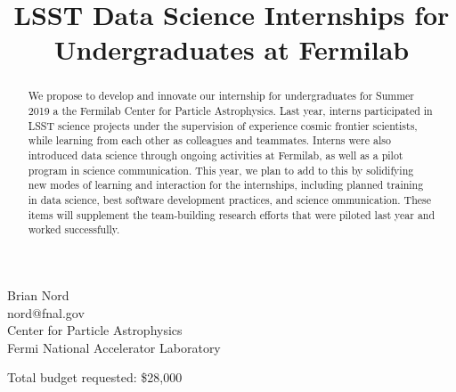 \title{%
LSST Data Science Internships for Undergraduates at Fermilab}
\date{} %


\maketitle

\vspace{-1.5cm}
\begin{center}
Brian Nord \\ nord@fnal.gov \\
Center for Particle Astrophysics\\
Fermi National Accelerator Laboratory\\
\vspace{0.3cm}
\end{center}
\vspace{1.5cm}

\begin{abstract}
\normalsize
We propose to develop and innovate our internship for undergraduates for Summer 2019 a the Fermilab Center for Particle Astrophysics.
Last year, interns participated in LSST science projects under the supervision of experience cosmic frontier scientists, while learning from each other as colleagues and teammates.
Interns were also introduced data science through ongoing activities at Fermilab, as well as a pilot program in science communication. 
This year, we plan to add to this by solidifying new modes of learning and interaction for the internships, including planned training in data science, best software development practices, and science ommunication.
These items will supplement the team-building research efforts that were piloted last year and worked successfully.
\end{abstract}

Total budget requested: \$28,000\par

